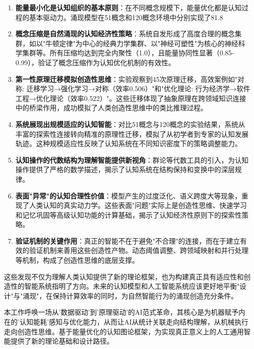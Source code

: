 \documentclass[12pt,a4paper]{article}
\begin{document}
\begin{enumerate}
\item \textbf{能量最小化是认知组织的基本原则}：在不同概念规模下，能量优化都是认知过程的基本驱动力。涌现模型在51概念和120概念环境中分别实现了81.8%

\item \textbf{概念压缩是自然涌现的认知经济性策略}：系统自发形成了高度合理的概念集群，如以"牛顿定律"为中心的经典力学集群、以"神经可塑性"为核心的神经科学集群等。所有压缩均达到完全内聚性（1.0），且能量协同性显著（0.85-0.99），验证了概念压缩作为认知优化机制的有效性。

\item \textbf{第一性原理迁移模拟创造性思维}：实验观察到45次原理迁移，高效案例如"对称: 迁移学习→强化学习→对称（效率0.506）"和"优化理论: 行为经济学→软件工程→优化理论（效率0.522）"。这些迁移体现了抽象原理在跨领域知识连接中的桥梁作用，成功模拟了人类创造性思维中的类比推理过程。

\item \textbf{系统展现出规模适应的认知智能}：对比51概念与120概念的实验结果，系统从丰富的探索性连接转向精准的原理性迁移，模拟了从初学者到专家的认知发展轨迹。这种规模适应性反映了认知系统在不同知识密度下的策略调整能力。

\item \textbf{认知操作的代数结构为理解智能提供新视角}：群论等代数工具的引入，为认知操作提供了严格的数学描述，揭示了认知系统在结构保持和变换中的深层规律。

\item \textbf{表面"异常"的认知合理性价值}：模型产生的过度泛化、语义跨度大等现象，重现了人类认知的真实动力学。这些表面"问题"实际上是创造性思维、快速学习和记忆巩固等高级认知功能的计算基础，揭示了认知经济性原则下的探索性策略。

\item \textbf{验证机制的关键作用}：真正的智能不在于避免"不合理"的连接，而在于建立有效的验证机制来善用这些创造性产物。动态阈值调整、跨领域映射和并行处理等机制，构成了创造性思维的底层支撑。
\end{enumerate}

这些发现不仅为理解人类认知提供了新的理论框架，也为构建真正具有适应性和创造性的智能系统指明了方向。未来的认知模型和人工智能系统应该更好地平衡"设计"与"涌现"，在保持计算效率的同时，为自然智能行为的涌现创造充分条件。

本工作呼唤一场从'数据驱动'到'原理驱动'的AI范式革命，其核心是为机器赋予内在的'认知能耗'感知与优化能力，从而让AI从统计关联走向结构理解，从机械执行走向创造性思维。基于能量优化的认知图论框架，为实现真正意义上的人工通用智能提供了新的理论基础和设计路径。
\end{document}
